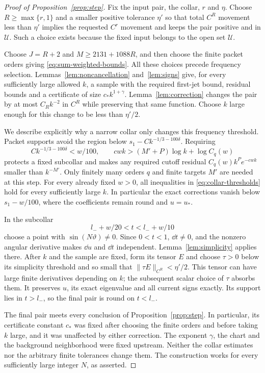 \begin{proof}[Proof of Proposition~\ref{prop:step}]
Fix the input pair, the collar, $r$ and $\eta$. Choose
$R\ge\max\{r,1\}$ and a smaller positive tolerance $\eta'$ so
that total $C^R$ movement less than $\eta'$ implies the requested
$C^r$ movement and keeps the pair positive and in $\mathcal U$.
Such a choice exists because the fixed input belongs to the open
set $\mathcal U$.

Choose $J=R+2$ and $M\ge2131+1088R$, and then choose the finite
packet orders giving \eqref{eq:sum-weighted-bounds}. All these
choices precede frequency selection. Lemmas~\ref{lem:noncancellation}
and~\ref{lem:signs} give, for every sufficiently large allowed $k$,
a sample with the required first-jet bound, residual bounds and a
certificate of size $c_*k^{1+\gamma}$. Lemma~\ref{lem:correction}
changes the pair by at most $C_Rk^{-2}$ in $C^R$ while preserving
that same function. Choose $k$ large enough for this change to be
less than $\eta'/2$.

We describe explicitly why a narrow collar only changes this
frequency threshold. Packet supports avoid the region below
$s_1-Ck^{-1/3-100\delta}$. Requiring
\begin{equation}\label{eq:collar-thresholds}
 Ck^{-1/3-100\delta}<w/100,
 \qquad
 cw k>(M'+P)\log k+\log C_q(w)
\end{equation}
protects a fixed subcollar and makes any required cutoff residual
$C_q(w)k^Pe^{-cw k}$ smaller than $k^{-M'}$. Only finitely many
orders $q$ and finite targets $M'$ are needed at this step.
For every already fixed $w>0$, all inequalities in
\eqref{eq:collar-thresholds} hold for every sufficiently large $k$.
In particular the exact corrections vanish below $s_1-w/100$,
where the coefficients remain round and $u=u_*$.

In the subcollar
\[
 l_-+w/20<t<l_-+w/10
\]
choose a point with $\sin(N\vartheta)\ne0$. Since $0<t<1$,
$\dd t\ne0$, and the nonzero angular derivative makes $\dd u$
and $\dd t$ independent. Lemma~\ref{lem:simplicity} applies there.
After $k$ and the sample are fixed, form its tensor $E$ and choose
$\tau>0$ below its simplicity threshold and so small that
$\lVert\tau E\rVert_{C^R}<\eta'/2$. This tensor can have large
finite derivatives depending on $k$; the subsequent scalar choice
of $\tau$ absorbs them. It preserves $u$, its exact eigenvalue and
all current signs exactly. Its support lies in $t>l_-$, so the
final pair is round on $t<l_-$.

The final pair meets every conclusion of
Proposition~\ref{prop:step}. In particular, its certificate constant
$c_*$ was fixed after choosing the finite orders and before taking
$k$ large, and it was unaffected by either correction. The
exponent $\gamma$, the chart and the background neighborhood were
fixed upstream. Neither the collar estimates nor the arbitrary
finite tolerances change them. The construction works for every
sufficiently large integer $N$, as asserted.
\end{proof}

